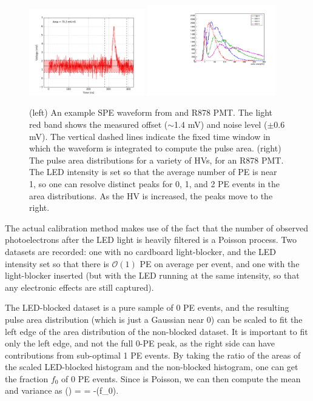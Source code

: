 {\begin{figure}[t]
  \begin{center}
    \includegraphics[width=0.450\textwidth]{figs/milliq/example_led_event_878.png}
    \includegraphics[width=0.500\textwidth]{figs/milliq/pmt_areas_hv_scan.pdf}
    \caption{(left) An example SPE waveform from and R878 PMT. The light red
      band shows the measured offset ($\sim$1.4 mV) and noise level ($\pm$0.6 mV).
      The vertical dashed lines indicate the fixed time window in which the 
      waveform is integrated to compute the pulse area.
      (right) The pulse area distributions
      for a variety of HVs, for an R878 PMT. The LED intensity is set so that
      the average number of PE is near 1, so one can resolve distinct peaks for
      0, 1, and 2 PE events in the area distributions. As the HV is increased, the peaks
      move to the right.
            }
    \label{fig:led_events}
  \end{center}
\end{figure}

The actual calibration method makes use of the fact that the number of observed photoelectrons
after the LED light is heavily filtered is a Poisson process. Two datasets are recorded:
one with no cardboard light-blocker, and the LED intensity set so that there
is $\mathcal{O}(1)$ PE on average per event, and one with the light-blocker inserted
(but with the LED running at the same intensity, so that any electronic effects
are still captured).

The LED-blocked dataset is a pure sample of 0 PE events, and the resulting pulse area distribution
(which is just a Gaussian near 0) can be scaled to fit the left edge of the area distribution
of the non-blocked dataset. It is important to fit only the left edge, and not the full 0-PE peak,
as the right side can have contributions from sub-optimal 1 PE events. By taking the ratio
of the areas of the scaled LED-blocked histogram and the non-blocked histogram, one can get
the fraction $f_0$ of 0 PE events. Since \Npe is Poisson, we can then compute the
mean and variance as
\be
{}(\Npe) = \langle \Npe\rangle = -\log(f_0).
\ee

}

